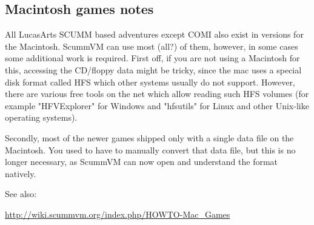 


\subsection {Macintosh games notes}

All LucasArts SCUMM based adventures except COMI also exist in versions for the
Macintosh. ScummVM can use most (all?) of them, however, in some cases some
additional work is required. First off, if you are not using a Macintosh for
this, accessing the CD/floppy data might be tricky, since the mac uses a
special disk format called HFS which other systems usually do not support.
However, there are various free tools on the net which allow reading such HFS
volumes (for example "HFVExplorer" for Windows and "hfsutils" for Linux and
other Unix-like operating systems).

Secondly, most of the newer games shipped only with a  single data file on the
Macintosh. You used to have to manually convert that data file, but this is no
longer necessary, as ScummVM can now open and understand the format natively.

See also:

  \url{http://wiki.scummvm.org/index.php/HOWTO-Mac_Games}
